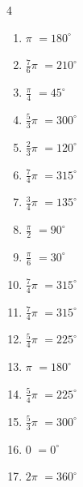 \begin{multicols}{4}
\begin{enumerate}
  \item $\displaystyle \pi$
        $\displaystyle =180^{\circ}$

  \item $\displaystyle \frac{7}{6}\pi$
        $\displaystyle =210^{\circ}$

  \item $\displaystyle \frac{\pi}{4}$
        $\displaystyle =45^{\circ}$

  \item $\displaystyle \frac{5}{3}\pi$
        $\displaystyle =300^{\circ}$

  \item $\displaystyle \frac{2}{3}\pi$
        $\displaystyle =120^{\circ}$

\columnbreak %

  \item $\displaystyle \frac{7}{4}\pi$
        $\displaystyle =315^{\circ}$

  \item $\displaystyle \frac{3}{4}\pi$
        $\displaystyle =135^{\circ}$

  \item $\displaystyle \frac{\pi}{2}$
        $\displaystyle =90^{\circ}$

  \item $\displaystyle \frac{\pi}{6}$
        $\displaystyle =30^{\circ}$

  \item $\displaystyle \frac{7}{4}\pi$
        $\displaystyle =315^{\circ}$

  \item $\displaystyle \frac{7}{4}\pi$
        $\displaystyle =315^{\circ}$

  \item $\displaystyle \frac{5}{4}\pi$
        $\displaystyle =225^{\circ}$

  \item $\displaystyle \pi$
        $\displaystyle =180^{\circ}$

  \item $\displaystyle \frac{5}{4}\pi$
        $\displaystyle =225^{\circ}$

  \item $\displaystyle \frac{5}{3}\pi$
        $\displaystyle =300^{\circ}$

  \item $\displaystyle 0$
        $\displaystyle =0^{\circ}$

  \item $\displaystyle 2\pi$
        $\displaystyle =360^{\circ}$


\end{enumerate}
\end{multicols}
